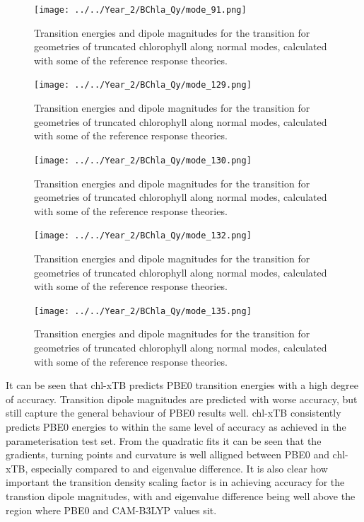 \begin{figure}
    \centering
    \texttt{[image: ../../Year\_2/BChla\_Qy/mode\_91.png]}
    \label{fig:mode_91}
    \caption{Transition energies and dipole magnitudes for the \Qy transition for
    geometries of truncated chlorophyll along normal modes, calculated with some 
    of the reference response theories.}
\end{figure}

\begin{figure}
    \centering
    \texttt{[image: ../../Year\_2/BChla\_Qy/mode\_129.png]}
    \label{fig:mode_129}
    \caption{Transition energies and dipole magnitudes for the \Qy transition for
    geometries of truncated chlorophyll along normal modes, calculated with some 
    of the reference response theories.}
\end{figure}

\begin{figure}
    \centering
    \texttt{[image: ../../Year\_2/BChla\_Qy/mode\_130.png]}
    \label{fig:mode_130}
    \caption{Transition energies and dipole magnitudes for the \Qy transition for
    geometries of truncated chlorophyll along normal modes, calculated with some 
    of the reference response theories.}
\end{figure}

\begin{figure}
    \centering
    \texttt{[image: ../../Year\_2/BChla\_Qy/mode\_132.png]}
    \label{fig:mode_132}
    \caption{Transition energies and dipole magnitudes for the \Qy transition for
    geometries of truncated chlorophyll along normal modes, calculated with some 
    of the reference response theories.}
\end{figure}

\begin{figure}
    \centering
    \texttt{[image: ../../Year\_2/BChla\_Qy/mode\_135.png]}
    \label{fig:mode_135}
    \caption{Transition energies and dipole magnitudes for the \Qy transition for
    geometries of truncated chlorophyll along normal modes, calculated with some 
    of the reference response theories.}
\end{figure}

It can be seen that chl-xTB predicts PBE0 transition energies with a high degree
of accuracy. Transition dipole magnitudes are predicted with worse accuracy, but
still capture the general behaviour of PBE0 results well. chl-xTB consistently 
predicts PBE0 energies to within the same level of accuracy as achieved in the 
parameterisation test set. From the quadratic fits it can be seen that the gradients, 
turning points and curvature is well alligned between PBE0 and chl-xTB, especially
compared to \dscf and eigenvalue difference. It is also clear how important the
transition density scaling factor is in achieving accuracy for the transtion dipole
magnitudes, with \dscf and eigenvalue difference being well above the region where
PBE0 and CAM-B3LYP values sit.


